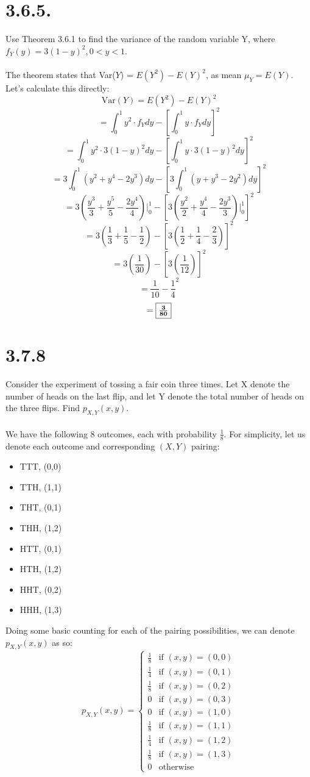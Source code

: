 \documentclass{article}
\begin{document}
{\section*{3.6.5.} 
Use Theorem 3.6.1 to find the variance of the random variable Y, where \(f_Y (y) = 3(1 - y)^2, 0 < y < 1\).
\\
\\
The theorem states that Var(\(Y\)) = \(E(Y^2) - E(Y)^2\), as mean \(\mu_Y = E(Y)\). Let's calculate this directly:
\[
\text{Var}(Y) = E(Y^2) - E(Y)^2 
\]
\[
= \int_{0}^{1} y^2 \cdot f_Y dy - [\int_{0}^{1} y \cdot f_Y dy]^2
\]
\[
= \int_{0}^{1} y^2 \cdot 3(1 - y)^2 dy - [\int_{0}^{1} y \cdot 3(1 - y)^2 dy]^2
\]
\[
= 3\int_{0}^{1} (y^2 + y^4 - 2y^3) dy - [3\int_{0}^{1} (y + y^3 - 2y^2) dy]^2
\]
\[
= 3(\frac{y^3}{3} + \frac{y^5}{5} - \frac{2y^4}{4}) \Big|_{0}^{1} - [3(\frac{y^2}{2} + \frac{y^4}{4} - \frac{2y^3}{3}) \Big|_{0}^{1}]^2
\]
\[
= 3(\frac{1}{3} + \frac{1}{5} - \frac{1}{2}) - [3(\frac{1}{2} + \frac{1}{4} - \frac{2}{3})]^2
\]
\[
= 3(\frac{1}{30}) - [3(\frac{1}{12})]^2
\]
\[
= \frac{1}{10} - \frac{1}{4}^2
\]
\[
= \fbox{\(\mathbf{\frac{3}{80}}\)}
\]

\section*{3.7.8} 
Consider the experiment of tossing a fair coin three times. Let X denote the number of heads on the last flip, and let Y denote the total number of heads on the three flips. Find \(p_{X,Y} (x, y)\).
\\
\\
We have the following 8 outcomes, each with probability \(\frac{1}{8}\). For simplicity, let us denote each outcome and corresponding \((X, Y)\) pairing:
\begin{itemize}
  \item TTT, (0,0)
  \item TTH, (1,1)
  \item THT, (0,1)
  \item THH, (1,2)
  \item HTT, (0,1)
  \item HTH, (1,2)
  \item HHT, (0,2)
  \item HHH, (1,3)
\end{itemize}
Doing some basic counting for each of the pairing possibilities, we can denote \(p_{X,Y} (x,y)\) as so: \\ 
\[
p_{X,Y}(x,y) = \begin{cases}
\frac{1}{8} & \text{if } (x,y) = (0,0) \\
\frac{1}{4} & \text{if } (x,y) = (0,1) \\
\frac{1}{8} & \text{if } (x,y) = (0,2) \\
0 & \text{if } (x,y) = (0,3) \\
0 & \text{if } (x,y) = (1,0) \\
\frac{1}{8} & \text{if } (x,y) = (1,1) \\
\frac{1}{4} & \text{if } (x,y) = (1,2) \\
\frac{1}{8} & \text{if } (x,y) = (1,3) \\
0 & \text{otherwise}
\end{cases}
\]

}
\end{document}
